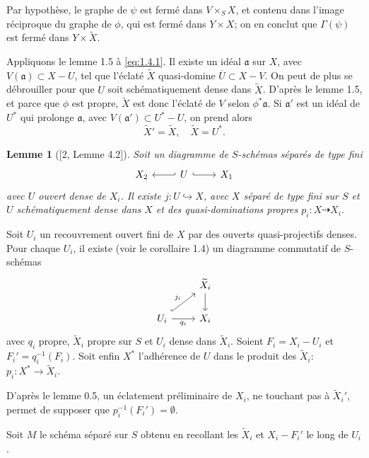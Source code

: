 \documentclass[11pt,a4paper]{article}
\theoremstyle{plain}
\newtheorem{lemma}[theorem]{Lemme}
\theoremstyle{definition}
\begin{document}
Par hypoth\`ese, le graphe de $\psi$ est ferm\'e dans $V \times_S X$, et contenu dans l'image r\'eciproque du graphe de $\phi$, qui est ferm\'e dans $Y \times X$; on en conclut que $\Gamma(\psi)$ est ferm\'e dans $Y \times \widetilde{X}$.

Appliquons le lemme 1.5 \`a \eqref{eq:1.4.1}. Il existe un id\'eal $\mathfrak{a}$ sur $X$, avec $V(\mathfrak{a}) \subset X - U$, tel que l'\'eclat\'e $\widetilde{X}$ quasi-domine $\overline{U} \subset X - V$. On peut de plus se d\'ebrouiller pour que $U$ soit sch\'ematiquement dense dans $\widetilde{X}$. D'apr\`es le lemme 1.5, et parce que $\phi$ est propre, $\widetilde{X}$ est donc l'\'eclat\'e de $V$ selon $\phi^*\mathfrak{a}$. Si $\mathfrak{a}'$ est un id\'eal de $U^*$ qui prolonge $\mathfrak{a}$, avec $V(\mathfrak{a}') \subset U^* - U$, on prend alors
\[
\widetilde{X}' = \widetilde{X}, \quad \widetilde{X} = U^*.
\]

\begin{lemma}[{[2, Lemme 4.2]}]
Soit un diagramme de $S$-sch\'emas s\'epar\'es de type fini
\[
\begin{tikzcd}
X_2 & U \arrow[l, hook'] \arrow[r, hook] & X_1
\end{tikzcd}
\]
avec $U$ ouvert dense de $X_i$. Il existe $j: U \hookrightarrow X$, avec $X$ s\'epar\'e de type fini sur $S$ et $U$ sch\'ematiquement dense dans $X$ et des quasi-dominations propres $p_i: X \dashrightarrow X_i$.
\end{lemma}

Soit $U_i$ un recouvrement ouvert fini de $X$ par des ouverts quasi-projectifs denses. Pour chaque $U_i$, il existe (voir le corollaire 1.4) un diagramme commutatif de $S$-sch\'emas
\[
\begin{tikzcd}
& \widetilde{X}_i \arrow[d] \\
U_i \arrow[ur, hook, "j_i"] \arrow[r, "q_i"'] & X_i
\end{tikzcd}
\]
avec $q_i$ propre, $\widetilde{X}_i$ propre sur $S$ et $U_i$ dense dans $\widetilde{X}_i$. Soient $F_i = X_i - U_i$ et $F_i' = q_i^{-1}(F_i)$. Soit enfin $X^*$ l'adh\'erence de $U$ dans le produit des $\widetilde{X}_i$: $p_i: X^* \to \widetilde{X}_i$.

D'apr\`es le lemme 0.5, un \'eclatement pr\'eliminaire de $X_i$, ne touchant pas \`a $\widetilde{X}_i'$, permet de supposer que $p_i^{-1}(F_i') = \emptyset$.

Soit $M$ le sch\'ema s\'epar\'e sur $S$ obtenu en recollant les $\widetilde{X}_i$ et $X_i - F_i'$ le long de $U_i$.
\end{document}
